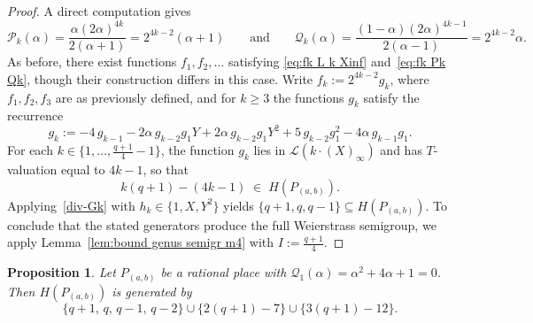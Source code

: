 \documentclass[12pt]{amsart}
\newtheorem{proposition}[theorem]{Proposition}
\theoremstyle{remark}
\theoremstyle{definition}
\newcommand{\coloneqq}{\mathrel{:=}}
\begin{document}
\begin{proof}
    A direct computation gives
    \[
        \mathcal{P}_k(\alpha) 
        = \frac{\alpha(2\alpha)^{4k}}{2(\alpha+1)} 
        = 2^{4k-2}(\alpha+1)
        \qquad \text{and} \qquad
        \mathcal{Q}_k(\alpha) 
        = \frac{(1-\alpha)(2\alpha)^{4k-1}}{2(\alpha-1)} 
        = 2^{4k-2}\alpha.
    \]
    As before, there exist functions $f_1, f_2, \ldots$ satisfying 
    \eqref{eq:fk L k Xinf} and~\eqref{eq:fk Pk Qk}, though their 
    construction differs in this case. Write $f_k \coloneqq 2^{4k-2} g_k$, 
    where $f_1, f_2, f_3$ are as previously defined, and for $k \geq 3$ 
    the functions $g_k$ satisfy the recurrence
    \[
        g_k \coloneqq -4\, g_{k-1} 
        - 2\alpha\, g_{k-2} g_1 Y 
        + 2\alpha\, g_{k-2} g_1 Y^2 
        + 5\, g_{k-2} g_1^2 
        - 4\alpha\, g_{k-1} g_1.
    \]
    For each $k \in \{1, \ldots, \frac{q+1}{4} - 1\}$, the function $g_k$ 
    lies in $\mathcal{L}(k \cdot (X)_\infty)$ and has $T$-valuation equal 
    to $4k - 1$, so that
    \[
        k(q+1) - (4k-1) \;\in\; H(P_{(a,b)}).
    \]
    Applying~\eqref{div-Gk} with $h_k \in \{1, X, Y^2\}$ yields 
    $\{q+1, q, q-1\} \subseteq H(P_{(a,b)})$. To conclude that the 
    stated generators produce the full Weierstrass semigroup, we apply 
    Lemma~\ref{lem:bound genus semigr m4} with $I \coloneqq \frac{q+1}{4}$.
\end{proof}
   
	\begin{proposition}\label{prop:Q1-zero}
    Let $P_{(a,b)}$ be a rational place with 
    $\mathcal{Q}_1(\alpha) = \alpha^2 + 4\alpha + 1 = 0$. Then 
    $H(P_{(a,b)})$ is generated by
    \[
        \{q+1,\, q,\, q-1,\, q-2\} 
        \cup \{2(q+1) - 7\} 
        \cup \{3(q+1) - 12\}.
    \]
\end{proposition}
\end{document}
